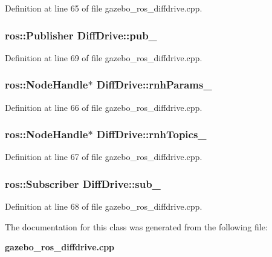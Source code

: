 Definition at line 65 of file gazebo\_\-ros\_\-diffdrive.cpp.

\subsubsection[{pub\_\-}]{\setlength{\rightskip}{0pt plus 5cm}ros::Publisher {\bf DiffDrive::pub\_\-}}\label{classDiffDrive_a7b00c16209fcfd6dc8db838906840011}


Definition at line 69 of file gazebo\_\-ros\_\-diffdrive.cpp.

\subsubsection[{rnhParams\_\-}]{\setlength{\rightskip}{0pt plus 5cm}ros::NodeHandle$\ast$ {\bf DiffDrive::rnhParams\_\-}}\label{classDiffDrive_aa68b5ef570c9542604abf1b5bd689d05}


Definition at line 66 of file gazebo\_\-ros\_\-diffdrive.cpp.

\subsubsection[{rnhTopics\_\-}]{\setlength{\rightskip}{0pt plus 5cm}ros::NodeHandle$\ast$ {\bf DiffDrive::rnhTopics\_\-}}\label{classDiffDrive_ae0abdd3d28b711a15650fddc0db08c0d}


Definition at line 67 of file gazebo\_\-ros\_\-diffdrive.cpp.

\subsubsection[{sub\_\-}]{\setlength{\rightskip}{0pt plus 5cm}ros::Subscriber {\bf DiffDrive::sub\_\-}}\label{classDiffDrive_a732405b61a7be96b377da44691ec0ec9}


Definition at line 68 of file gazebo\_\-ros\_\-diffdrive.cpp.



The documentation for this class was generated from the following file:\begin{DoxyCompactItemize}
\item 
{\bf gazebo\_\-ros\_\-diffdrive.cpp}\end{DoxyCompactItemize}
